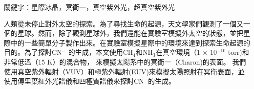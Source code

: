 \begin{abstractcn}

關鍵字：星際冰晶，冥衛一，真空紫外光，超真空紫外光
\vspace{2em}

人類從未停止對外太空的探索。為了尋找生命的起源，天文學家們觀測了一個又一個的星球。然而，除了觀測星球外，我們還能在實驗室模擬外太空的狀態，並把星際中的一些簡單分子製作出來。在實驗室模擬星際中的環境來達到探索生命起源的目的。為了探討CN$^-$ 的生成，本文使用CH$_4$和NH$_3$在真空環境（1 $\times$ 10$^{-10}$ torr)和非常低溫（15 K）的混合物， 來模擬太陽系中的冥衛一（Charon)的表面。 我們使用真空紫外輻射（VUV）和極紫外輻射(EUV)來模擬太陽照射在冥衛表面，並使用傅里葉紅外光譜儀和四極質譜儀來探討CN$^-$的生成。

\end{abstractcn} 
